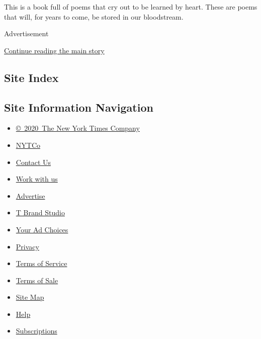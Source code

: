 This is a book full of poems that cry out to be learned by heart. These
are poems that will, for years to come, be stored in our bloodstream.

Advertisement

\protect\hyperlink{after-bottom}{Continue reading the main story}

\hypertarget{site-index}{%
\subsection{Site Index}\label{site-index}}

\hypertarget{site-information-navigation}{%
\subsection{Site Information
Navigation}\label{site-information-navigation}}

\begin{itemize}
\tightlist
\item
  \href{https://help.nytimes3xbfgragh.onion/hc/en-us/articles/115014792127-Copyright-notice}{©~2020~The
  New York Times Company}
\end{itemize}

\begin{itemize}
\tightlist
\item
  \href{https://www.nytco.com/}{NYTCo}
\item
  \href{https://help.nytimes3xbfgragh.onion/hc/en-us/articles/115015385887-Contact-Us}{Contact
  Us}
\item
  \href{https://www.nytco.com/careers/}{Work with us}
\item
  \href{https://nytmediakit.com/}{Advertise}
\item
  \href{http://www.tbrandstudio.com/}{T Brand Studio}
\item
  \href{https://www.nytimes3xbfgragh.onion/privacy/cookie-policy\#how-do-i-manage-trackers}{Your
  Ad Choices}
\item
  \href{https://www.nytimes3xbfgragh.onion/privacy}{Privacy}
\item
  \href{https://help.nytimes3xbfgragh.onion/hc/en-us/articles/115014893428-Terms-of-service}{Terms
  of Service}
\item
  \href{https://help.nytimes3xbfgragh.onion/hc/en-us/articles/115014893968-Terms-of-sale}{Terms
  of Sale}
\item
  \href{https://spiderbites.nytimes3xbfgragh.onion}{Site Map}
\item
  \href{https://help.nytimes3xbfgragh.onion/hc/en-us}{Help}
\item
  \href{https://www.nytimes3xbfgragh.onion/subscription?campaignId=37WXW}{Subscriptions}
\end{itemize}
